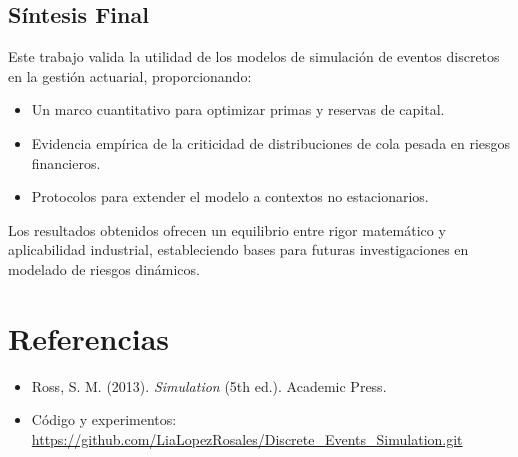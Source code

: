 \documentclass{article}
\begin{document}
\subsection{Síntesis Final}
Este trabajo valida la utilidad de los modelos de simulación de eventos discretos en la gestión actuarial, proporcionando:
\begin{itemize}
    \item Un marco cuantitativo para optimizar primas y reservas de capital.
    \item Evidencia empírica de la criticidad de distribuciones de cola pesada en riesgos financieros.
    \item Protocolos para extender el modelo a contextos no estacionarios.
\end{itemize}
Los resultados obtenidos ofrecen un equilibrio entre rigor matemático y aplicabilidad industrial, estableciendo bases para futuras investigaciones en modelado de riesgos dinámicos.

\section*{Referencias}
\begin{itemize}
    \item Ross, S. M. (2013). \textit{Simulation} (5th ed.). Academic Press.
    \item Código y experimentos: \url{https://github.com/LiaLopezRosales/Discrete_Events_Simulation.git}
\end{itemize}
\end{document}
